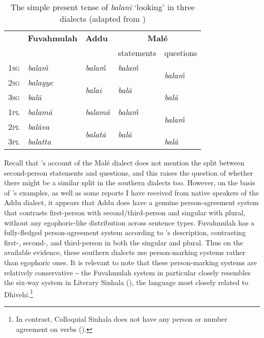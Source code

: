 \documentclass[output=paper]{langsci/langscibook}
\begin{document}
\begin{table}
\begin{tabularx}{.85\textwidth}{|X|l|l|l|l|}

\hline
	&	\textbf{	Fuvahmulah	}	&	\textbf{	Addu	}	&	\multicolumn{2}{c|}{\textbf{	Malé	}}					\\
	&				&				&		statements		&		questions		\\
\hline
\textsc{1sg} 	&	\textit{	balam̊	}	&	\textit{	balam̊	}	&	\textit{	balam̊	}	&	\multirow{2}{*}{\textit{balam̊}}	\\\cline{1-4}
\textsc{2sg}	&	\textit{	balayye	}	&	\multirow{2}{*}{\textit{	balai	}}	&	\multirow{2}{*}{\textit{	balā	}}	&				\\\cline{1-2} \cline{5-5}
\textsc{3sg}	&	\textit{	balā	}	&				&				&	\textit{	balā	}	\\
\hline
\textsc{1pl}	&	\textit{	balamā	}	&	\textit{	balamā	}	&	\textit{	balam̊	}	&	\multirow{2}{*}{\textit{	balam̊	}}	\\ \cline{1-4}
\textsc{2pl}	&	\textit{	balāva	}	&	\multirow{2}{*}{\textit{	balatā	}}	&	\multirow{2}{*}{\textit{	balā	}}	&				\\\cline{1-2} \cline{5-5}
\textsc{3pl}	&	\textit{	balatta	}	&				&				&	\textit{	balā	}	\\
\hline

\end{tabularx}
\caption{The simple present tense of \textit{balanī} ‘looking’ in three dialects 
(adapted from \citealt[169]{Fritz2002})}
\label{tab:jl7}
\end{table}

Recall that \citeauthor{Fritz2002}’s account of the Malé dialect does not mention the split between second-person statements and questions, and this raises the question of whether there might be a similar split in the southern dialects too. However, on the basis of \citeauthor{Fritz2002}’s examples, as well as some reports I have received from native speakers of the Addu dialect, it appears that Addu does have a genuine person-agreement system that contrasts first-person with second/third-person and singular with plural, without any egophoric-like distribution across sentence types. Fuvahmulah has a fully-fledged person-agreement system according to \citeauthor{Fritz2002}’s description, contrasting first-, second-, and third-person in both the singular and plural. Thus on the available evidence, these southern dialects use person-marking systems rather than egophoric ones. It is relevant to note that these person-marking systems are relatively conservative ‒ the Fuvahmulah system in particular closely resembles the six-way system in Literary Sinhala (\citealt[168–175]{Fritz2002}), the language most closely related to Dhivehi.\footnote{ In contrast, Colloquial Sinhala does not have any person or number agreement on verbs (\citealt[15]{Gair1990}).}
\end{document}
